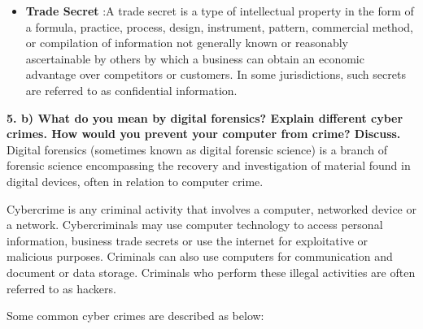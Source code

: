 \documentclass [12pt, a4paper]{article}
\begin{document}
\begin{itemize}
	\item \textbf{Trade Secret} :A trade secret is a type of intellectual property in the form of a formula, practice, process, design, instrument, pattern, commercial method, or compilation of information not generally known or reasonably ascertainable by others by which a business can obtain an economic advantage over competitors or customers. In some jurisdictions, such secrets are referred to as confidential information.\\
\end{itemize}

\large
\textbf{5. b) What do you mean by digital forensics? Explain different cyber crimes. How would you prevent your computer from crime? Discuss.}\\
\normalsize
Digital forensics (sometimes known as digital forensic science) is a branch of forensic science encompassing the recovery and investigation of material found in digital devices, often in relation to computer crime.\\
\par
Cybercrime is any criminal activity that involves a computer, networked device or a network. Cybercriminals may use computer technology to access personal information, business trade secrets or use the internet for exploitative or malicious purposes. Criminals can also use computers for communication and document or data storage. Criminals who perform these illegal activities are often referred to as hackers.\\
\par
Some common cyber crimes are described as below:
\end{document}
